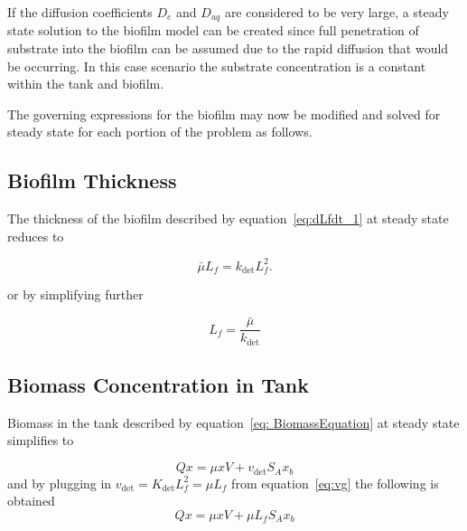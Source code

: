 \documentclass[letterpaper, twoside]{article}
\numberwithin{equation}{section}
\begin{document}
If the diffusion coefficients $D_e$ and $D_{aq}$ are considered to be very large, a steady state solution to the biofilm model can be created since full penetration of substrate into the biofilm can be assumed due to the rapid diffusion that would be occurring. In this case scenario the substrate concentration is a constant within the tank and biofilm.

The governing expressions for the biofilm may now be modified and solved for steady state for each portion of the problem as follows.

\subsection{Biofilm Thickness}
The thickness of the biofilm described by equation~\ref{eq:dLfdt_1} at steady state reduces to 

\begin{equation*}
   {\bar\mu L_f}={k_{\mathrm{det}}L_f^2}.
\end{equation*}
 
 or by simplifying further
 
 \begin{equation}
  \label{eq:Lfsteady}
  {L_f}=\frac{\bar\mu}{k_{\mathrm{det}}}
\end{equation}

\subsection{Biomass Concentration in Tank}
Biomass in the tank described by equation~\ref{eq: BiomassEquation} at steady state simplifies to 

\begin{equation*} 
  Qx = \mu xV +v_{\mathrm{det}} S_A x_b
\end{equation*}
and by plugging in $v_{\mathrm{det}}= K_\mathrm{det} L_f^2 = \mu L_f$ from equation~\ref{eq:vg} the following is obtained
\begin{equation}
  Qx = \mu xV +\mu L_f S_A x_b
\end{equation}
\end{document}
